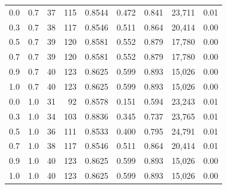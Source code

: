 \begin{table}[!htbp]
\begin{tabular}{ccrrrrrrr}
\hline
0.0 & 0.7 & 37 & 115 & 0.8544 & 0.472 & 0.841 & 23,711 & 0.01 \\
0.3 & 0.7 & 38 & 117 & 0.8546 & 0.511 & 0.864 & 20,414 & 0.00 \\
0.5 & 0.7 & 39 & 120 & 0.8581 & 0.552 & 0.879 & 17,780 & 0.00 \\
0.7 & 0.7 & 39 & 120 & 0.8581 & 0.552 & 0.879 & 17,780 & 0.00 \\
0.9 & 0.7 & 40 & 123 & 0.8625 & 0.599 & 0.893 & 15,026 & 0.00 \\
1.0 & 0.7 & 40 & 123 & 0.8625 & 0.599 & 0.893 & 15,026 & 0.00 \\
\hline
0.0 & 1.0 & 31 & 92 & 0.8578 & 0.151 & 0.594 & 23,243 & 0.01 \\
0.3 & 1.0 & 34 & 103 & 0.8836 & 0.345 & 0.737 & 23,765 & 0.01 \\
0.5 & 1.0 & 36 & 111 & 0.8533 & 0.400 & 0.795 & 24,791 & 0.01 \\
0.7 & 1.0 & 38 & 117 & 0.8546 & 0.511 & 0.864 & 20,414 & 0.01 \\
0.9 & 1.0 & 40 & 123 & 0.8625 & 0.599 & 0.893 & 15,026 & 0.00 \\
1.0 & 1.0 & 40 & 123 & 0.8625 & 0.599 & 0.893 & 15,026 & 0.00 \\
\hline
\end{tabular}
\end{table}
